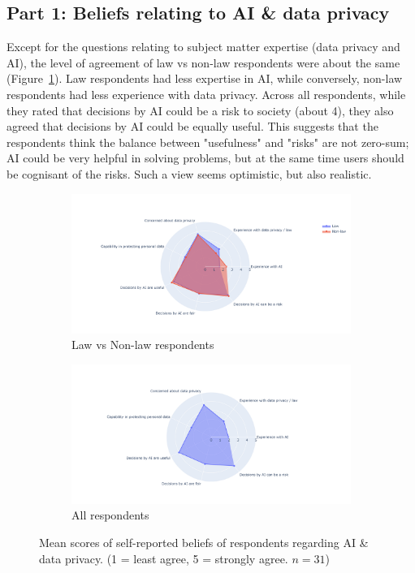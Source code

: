 \subsection{Part 1: Beliefs relating to AI \& data privacy}
Except for the questions relating to subject matter expertise (data privacy and AI), the level of agreement of law vs non-law respondents were about the same (Figure~\ref{fig:demo_3}). Law respondents had less expertise in AI, while conversely, non-law respondents had less experience with data privacy. Across all respondents, while they rated that decisions by AI could be a risk to society (about 4), they also agreed that decisions by AI could be equally useful. This suggests that the respondents think the balance between "usefulness" and "risks" are not zero-sum; AI could be very helpful in solving problems, but at the same time users should be cognisant of the risks. Such a view seems optimistic, but also realistic.

\begin{figure}[!ht]
    \begin{subfigure}[b]{1\textwidth}
      \centering
      \includegraphics[width=1\linewidth]{figures/demo_3.png}
      \caption{Law vs Non-law respondents}
    \end{subfigure}
    \hfill
    \begin{subfigure}[b]{1\textwidth}
      \centering
      \includegraphics[width=1\linewidth]{figures/demo_4.png}
      \caption{All respondents}
    \end{subfigure}
    \caption{Mean scores of self-reported beliefs of respondents regarding AI \& data privacy. (1 = least agree, 5 = strongly agree. $n=31$)}
    \label{fig:demo_3}
\end{figure}

